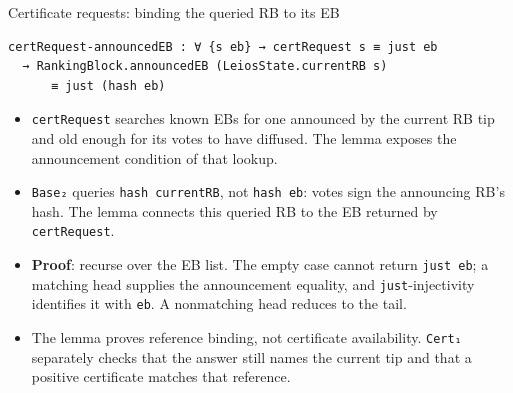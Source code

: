 \documentclass[aspectratio=169,10pt]{beamer}
\newcommand{\agda}[1]{\texttt{#1}}
\begin{document}
\begin{frame}[fragile]{Certificate requests: binding the queried RB to its EB}
\begin{verbatim}
certRequest-announcedEB : ∀ {s eb} → certRequest s ≡ just eb
  → RankingBlock.announcedEB (LeiosState.currentRB s)
      ≡ just (hash eb)
\end{verbatim}
  \begin{itemize}
    \item \agda{certRequest} searches known EBs for one announced by the
          current RB tip and old enough for its votes to have diffused.
          The lemma exposes the announcement condition of that lookup.
    \item \agda{Base₂} queries \agda{hash currentRB}, not \agda{hash eb}:
          votes sign the announcing RB's hash.  The lemma connects this
          queried RB to the EB returned by \agda{certRequest}.
    \item \textbf{Proof}: recurse over the EB list.  The empty case cannot
          return \agda{just eb}; a matching head supplies the announcement
          equality, and \agda{just}-injectivity identifies it with \agda{eb}.
          A nonmatching head reduces to the tail.
    \item The lemma proves reference binding, not certificate availability.
          \agda{Cert₁} separately checks that the answer still names the
          current tip and that a positive certificate matches that reference.
  \end{itemize}
\end{frame}
\end{document}
